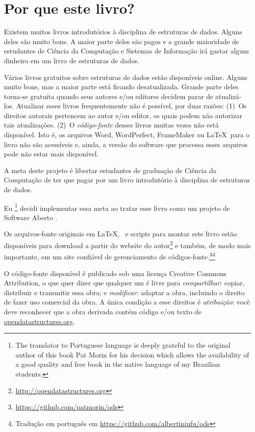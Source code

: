 \chapter*{Por que este livro?}

Existem muitos livros introdutórios à disciplina de estruturas de dados.
Alguns deles são muito bons. A maior parte deles são pagos e a
grande maioridade de estudantes de Ciência da Computação e Sistemas de
Informação irá gastar algum dinheiro em um livro de estruturas de dados.

Vários livros gratuitos sobre estruturas de dados estão disponíveis online.
Alguns muito bons, mas a maior parte está ficando desatualizada. Grande
parte deles torna-se gratuita quando seus autores e/ou editores decidem
parar de atualizá-los. Atualizar esses livros frequentemente não é possível,
por duas razões: (1)~Os direitos autorais pertencem ao autor e/ou editor,
os quais podem não autorizar tais atualizações. (2)~O \emph{código-fonte} desses
livros muitas vezes não está disponível. Isto é, os arquivos Word, WordPerfect,
FrameMaker ou \LaTeX\ para o livro não são acessíveis e, ainda, a versão do
software que processa esses arquivos pode não estar mais disponível.

A meta deste projeto é libertar estudantes de graduação de Ciência da Computação
de ter que pagar por um livro introdutório à disciplina de estruturas de dados.

Eu
\footnote{The translator to Portuguese language is deeply grateful to the original author of this book Pat Morin for his decision which allows the availability of a good quality and free book in the
native language of my Brazilian students.} decidi implementar essa meta ao tratar esse livro como um projeto de Software Aberto%
%
%
.

Os arquivos-fonte originais em \LaTeX, \lang\ e scripts para montar este livro estão disponíveis para download a partir do website do autor\footnote{\url{http://opendatastructures.org}}
e também, de modo mais importante, em um site confiável de gerenciamento de códigos-fonte.\footnote{\url{https://github.com/patmorin/ods}}\footnote{Tradução em português em \url{https://github.com/albertiniufu/ods}}

O código-fonte disponível é publicado sob uma licença
Creative Commons Attribution,
o que quer dizer que qualquer um é livre para \emph{compartilhar}:
copiar, distribuir e
transmitir essa obra; e \emph{modificar}:
adaptar a obra, incluindo o direito
de fazer uso comercial da obra.
A única condição a esse direitos é \emph{atribuição}:
você deve reconhecer que a obra derivada contém código e/ou texto de \url{opendatastructures.org}.

